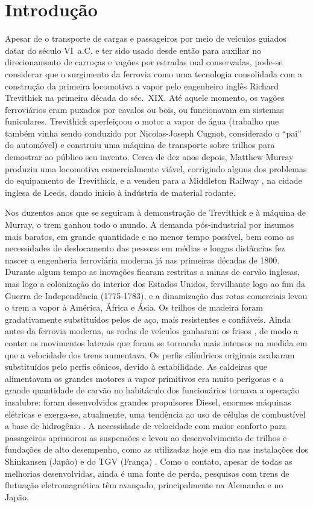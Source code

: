 \chapter{Introdução\label{cap: intro}}

Apesar de o transporte de cargas e passageiros por meio de veículos guiados datar do século VI~a.C. \cite{lewis_railways_2001} 
e ter sido usado desde então para auxiliar no direcionamento de carroças e vagões por estradas mal conservadas, 
pode-se considerar que o surgimento da ferrovia como uma tecnologia consolidada com a construção da primeira locomotiva a 
vapor pelo engenheiro inglês Richard Trevithick na primeira década do séc.~XIX. Até aquele momento, os vagões ferroviários eram puxados por 
cavalos ou bois, ou funcionavam em sistemas funiculares. Trevithick aperfeiçoou o motor a vapor de água
(trabalho que também vinha sendo conduzido por Nicolas-Joseph Cugnot, considerado o ``pai'' do automóvel) e 
construiu uma máquina de transporte sobre trilhos para demostrar ao público seu invento. Cerca de dez anos depois, 
Matthew Murray produziu uma locomotiva comercialmente viável, corrigindo alguns dos problemas do equipamento de Trevithick, 
e a vendeu para a Middleton Railway \cite{middleton_railway_middleton_2013}, na cidade inglesa de Leeds, dando início 
à indústria de material rodante. 

Nos duzentos anos que se seguiram à demonstração de Trevithick e à máquina de Murray, o trem ganhou todo o mundo. 
A demanda pós-industrial por insumos mais baratos, em grande quantidade e no menor tempo possível, bem como as 
necessidades de deslocamento das pessoas em médias e longas distâncias fez nascer a engenheria ferroviária 
moderna já nas primeiras décadas de 1800. Durante algum tempo as inovações ficaram restritas a minas de 
carvão inglesas, mas logo a colonização do interior dos Estados Unidos, fervilhante logo ao fim da 
Guerra de Independência (1775-1783), e a dinamização das rotas comerciais levou o trem a vapor à 
América, África e Ásia. Os trilhos de madeira foram gradativamente substituídos pelos de aço, mais 
resistentes e confiáveis. Ainda antes da ferrovia moderna, as rodas de veículos ganharam os frisos \cite{wickens_dynamics_1998}, 
de modo a conter os movimentos laterais que 
foram se tornando mais intensos na medida em que a velocidade dos trens aumentava. Os perfis cilíndricos 
originais acabaram substituídos pelo perfis cônicos, devido à estabilidade. As caldeiras 
que alimentavam os grandes motores a vapor primitivos era muito perigosas e a grande quantidade de 
carvão no habitáculo dos funcionários tornava a operação insalubre: foram desenvolvidos grandes propulsores 
Diesel, enormes máquinas elétricas e exerga-se, atualmente, uma tendência ao uso
de células de combustível a base de hidrogênio \cite{ruf_study_2019}. A necessidade de 
velocidade com maior conforto para passageiros aprimorou as suspensões e levou ao desenvolvimento de trilhos e 
fundações de alto desempenho, como as utilizadas hoje em dia nas instalações dos Shinkansen (Japão) e do TGV (França) \cite{iwnicki_future_2009}. 
Como o contato, apesar de todas as melhorias desenvolvidas, ainda é uma fonte de perda, pesquisas com trens de flutuação 
eletromagnética têm avançado, principalmente na Alemanha e no Japão.

